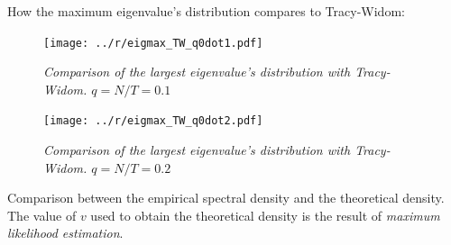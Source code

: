 \documentclass{article}
\begin{document}
How the maximum eigenvalue's distribution compares to Tracy-Widom:

\begin{figure}[htb!]
  \centering
  \texttt{[image: ../r/eigmax\_TW\_q0dot1.pdf]}
  \caption{\small \it Comparison of the largest eigenvalue's
    distribution with Tracy-Widom. $q=N/T=0.1$}
  \label{fig:eig1_TW_q0.1}
\end{figure}

\begin{figure}[htb!]
  \centering
  \texttt{[image: ../r/eigmax\_TW\_q0dot2.pdf]}
  \caption{\small \it Comparison of the largest eigenvalue's
    distribution with Tracy-Widom. $q=N/T=0.2$}
  \label{fig:eig1_TW_q0.2}
\end{figure}

Comparison between the empirical spectral density and the theoretical
density. The value of $v$ used to obtain the theoretical density is
the result of {\it maximum likelihood estimation}.
\end{document}
